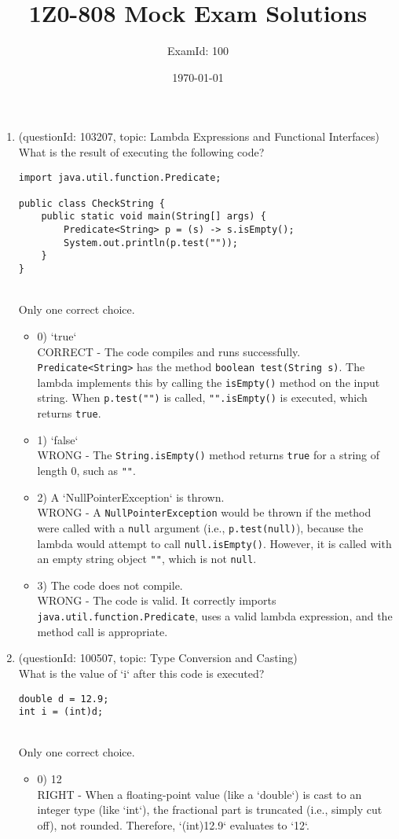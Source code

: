\documentclass[12pt]{article}
\title{\textbf{1Z0-808 Mock Exam Solutions}}
\author{ExamId: 100}
\date{\today}
\begin{document}
\maketitle
\newpage\begin{enumerate}[label=(\arabic*)]
\item (questionId: 103207, topic: Lambda Expressions and Functional Interfaces) \\ 
What is the result of executing the following code?
\begin{verbatim}
import java.util.function.Predicate;

public class CheckString {
    public static void main(String[] args) {
        Predicate<String> p = (s) -> s.isEmpty();
        System.out.println(p.test(""));
    }
}
\end{verbatim}
\\ \noindent Only one correct choice. 
\begin{itemize}
\item 0) `true`
 \\ 
CORRECT - The code compiles and runs successfully. \verb|Predicate<String>| has the method \verb|boolean test(String s)|. The lambda implements this by calling the \verb|isEmpty()| method on the input string. When \verb|p.test("")| is called, \verb|"".isEmpty()| is executed, which returns \verb|true|.

\item 1) `false`
 \\ 
WRONG - The \verb|String.isEmpty()| method returns \verb|true| for a string of length 0, such as \verb|""|.

\item 2) A `NullPointerException` is thrown.
 \\ 
WRONG - A \verb|NullPointerException| would be thrown if the method were called with a \verb|null| argument (i.e., \verb|p.test(null)|), because the lambda would attempt to call \verb|null.isEmpty()|. However, it is called with an empty string object \verb|""|, which is not \verb|null|.

\item 3) The code does not compile.
 \\ 
WRONG - The code is valid. It correctly imports \verb|java.util.function.Predicate|, uses a valid lambda expression, and the method call is appropriate.

\end{itemize}
\item (questionId: 100507, topic: Type Conversion and Casting) \\ 
What is the value of `i` after this code is executed?
\begin{verbatim}
double d = 12.9;
int i = (int)d;
\end{verbatim}
\\ \noindent Only one correct choice. 
\begin{itemize}
\item 0) 12
 \\ 
RIGHT - When a floating-point value (like a `double`) is cast to an integer type (like `int`), the fractional part is truncated (i.e., simply cut off), not rounded. Therefore, `(int)12.9` evaluates to `12`.


\end{itemize}
\end{enumerate}
\end{document}
